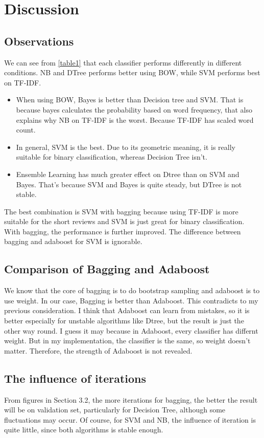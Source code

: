 \documentclass[paper=a4, fontsize=11pt, UTF8]{article} %
\begin{document}
\section{Discussion}
\subsection{Observations}
We can see from \ref{table1} that each classifier performs differently in different conditions. NB and DTree performs better using BOW, while SVM performs best on TF-IDF. 
\begin{itemize}
    \item When using BOW, Bayes is better than Decision tree and SVM. That is because bayes calculates the probability based on word frequency, that also explains why NB on TF-IDF is the worst. Because TF-IDF has scaled word count.
    \item In general, SVM is the best. Due to its geometric meaning, it is really suitable for binary classification, whereas Decision Tree isn't.
    \item Ensemble Learning has much greater effect on Dtree than on SVM and Bayes. That's because SVM and Bayes is quite steady, but DTree is not stable.
\end{itemize}

The best combination is SVM with bagging because using TF-IDF is more suitable for the short reviews and SVM is just great for binary classification. With bagging, the performance is further improved. The difference between bagging and adaboost for SVM is ignorable.

\subsection{Comparison of Bagging and Adaboost}
We know that the core of bagging is to do bootstrap sampling and adaboost is to use weight. In our case, Bagging is better than Adaboost. This contradicts to my previous consideration. I think that Adaboost can learn from mistakes, so it is better especially for unstable algorithms like Dtree, but the result is just the other way round. I guess it may because in Adaboost, every classifier has differnt weight. But in my implementation, the classifier is the same, so weight doesn't matter. Therefore, the strength of Adaboost is not revealed.

\subsection{The influence of iterations}
From figures in Section 3.2, the more iterations for bagging, the better the result will be on validation set, particularly for Decision Tree, although some fluctuations may occur. Of course, for SVM and NB, the influence of iteration is quite little, since both algorithms is stable enough.
\end{document}
